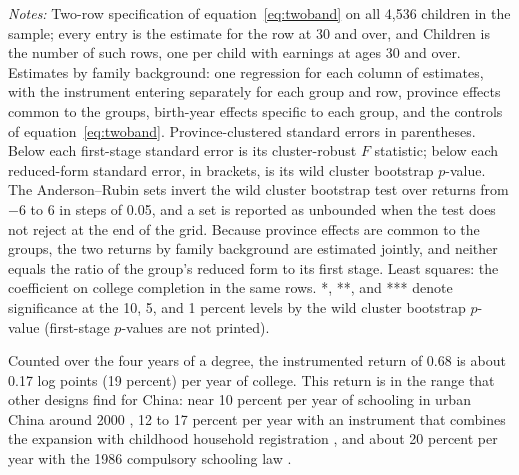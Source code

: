 \documentclass[11pt]{article}
\begin{document}
\begin{table}[t]
\centering
\small
\caption{First stages, earnings reduced forms, and returns to college, for all children and
by family background.}
\label{tab:groups}

\par\smallskip
\begin{minipage}{0.92\textwidth}
\footnotesize\emph{Notes:} Two-row specification of equation~\eqref{eq:twoband} on all 4,536 children in the sample; every entry is the estimate for the row at 30 and over, and Children is the number of such rows, one per child with earnings at ages 30 and over. Estimates by family background: one regression for each column of estimates, with the instrument entering separately for each group and row, province effects common to the groups, birth-year effects specific to each group, and the controls of equation~\eqref{eq:twoband}. Province-clustered standard errors in parentheses. Below each first-stage standard error is its cluster-robust $F$ statistic; below each reduced-form standard error, in brackets, is its wild cluster bootstrap $p$-value. The Anderson--Rubin sets invert the wild cluster bootstrap test over returns from $-6$ to 6 in steps of 0.05, and a set is reported as unbounded when the test does not reject at the end of the grid. Because province effects are common to the groups, the two returns by family background are estimated jointly, and neither equals the ratio of the group's reduced form to its first stage. Least squares: the coefficient on college completion in the same rows. *, **, and *** denote significance at the 10, 5, and 1 percent levels by the wild cluster bootstrap $p$-value (first-stage $p$-values are not printed).
\end{minipage}
\end{table}

Counted over the four years of a degree, the instrumented return of 0.68 is about 0.17 log points (19 percent) per year of college. This return is in the range that other designs find for China: near 10 percent per year of schooling in urban China around 2000 \citep{ZhangZhaoParkSong2005, HeckmanLi2004}, 12 to 17 percent per year with an instrument that combines the expansion with childhood household registration \citep{HuangTaniWeiZhu2022}, and about 20 percent per year with the 1986 compulsory schooling law \citep{FangEtAl2012}.
\end{document}
